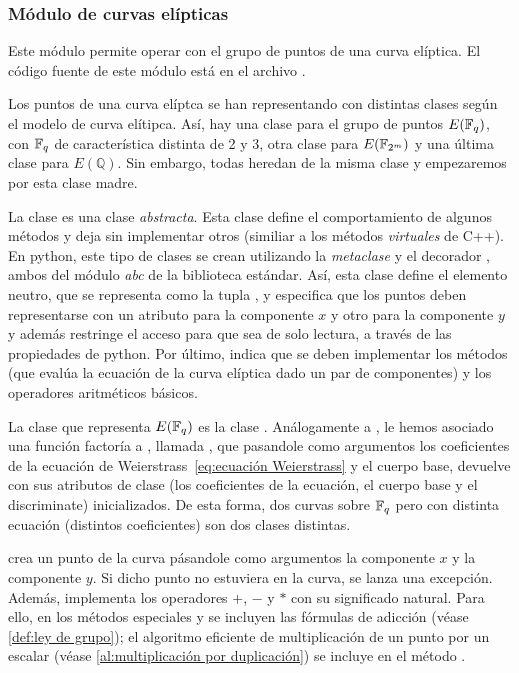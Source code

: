 \subsubsection{Módulo de curvas elípticas}
\label{subs:Módulo de curvas elípticas}

Este módulo permite operar con el grupo de puntos de una curva elíptica. El código fuente de este módulo está en el archivo .

Los puntos de una curva elíptca se han representando con distintas clases según el modelo de curva elítipca. Así, hay una clase para el grupo de puntos $E(\mathbb{F}_q)$, con $\mathbb{F}_q$ de característica distinta de 2 y 3, otra clase para $E(\mathbb{F}_{2^m})$ y una última clase para $E(\mathbb{Q})$. Sin embargo, todas heredan de la misma clase y empezaremos por esta clase madre.

La clase  es una clase \emph{abstracta}. Esta clase define el comportamiento de algunos métodos y deja sin implementar otros (similiar a los métodos \emph{virtuales} de C++). En python, este tipo de clases se crean utilizando la \emph{metaclase}  y el decorador , ambos del módulo \emph{abc} de la biblioteca estándar. Así, esta clase define el elemento neutro, que se representa como la tupla , y especifica que los puntos deben representarse con un atributo para la componente $x$ y otro para la componente $y$ y además restringe el acceso para que sea de solo lectura, a través de las propiedades de python. Por último, indica que se deben implementar los métodos  (que evalúa la ecuación de la curva elíptica dado un par de componentes) y los operadores aritméticos básicos.

La clase que representa $E(\mathbb{F}_q)$ es la clase . Análogamente a , le hemos asociado una función factoría a , llamada , que pasandole como argumentos los coeficientes de la ecuación de Weierstrass~\ref{eq:ecuación Weierstrass} y el cuerpo base, devuelve  con sus atributos de clase (los coeficientes de la ecuación, el cuerpo base y el discriminate) inicializados. De esta forma, dos curvas sobre $\mathbb{F}_q$ pero con distinta ecuación (distintos coeficientes) son dos clases distintas.

 crea un punto de la curva pásandole como argumentos la componente $x$ y la componente $y$. Si dicho punto no estuviera en la curva, se lanza una excepción. Además,  implementa los operadores $+$, $-$ y $*$ con su significado natural. Para ello, en los métodos especiales  y  se incluyen las fórmulas de adicción (véase \ref{def:ley de grupo}); el algoritmo eficiente de multiplicación de un punto por un escalar (véase \ref{al:multiplicación por duplicación}) se incluye en el método .

